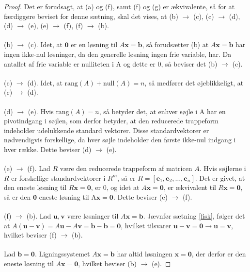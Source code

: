 \begin{proof}
\noindent
Det er forudsagt, at (a) og (f), samt (f) og (g) er ækvivalente, så for at færdiggøre beviset for denne sætning, skal det vises, at (b) $\rightarrow$ (c), (c) $\rightarrow$ (d), (d) $\rightarrow$ (e), (e) $\rightarrow$ (f), (f) $\rightarrow$ (b).
\\\\
%
(b) $\rightarrow$ (c). 
Idet, at $\mathbf{0}$ er en løsning til $A\mathbf{x}=\mathbf{b}$, så forudsætter (b) at $A\mathbf{x}=\mathbf{b}$ har ingen ikke-nul løsninger, da den generelle løsning ingen frie variable, har. 
Da antallet af frie variable er nulliteten i A og dette er 0, så beviser det (b) $\rightarrow$ (c). 
\\\\
%
(c) $\rightarrow$ (d).
Idet, at $\text{rang}(A)+\text{null}(A)=n$, så medfører det øjeblikkeligt, at (c) $\rightarrow$ (d).
\\\\
%
(d) $\rightarrow$ (e).
Hvis $\text{rang}(A)=n$, så betyder det, at enhver søjle i A har en pivotindgang i søjlen, som derfor betyder, at den reducerede trappeform indeholder udelukkende standard vektorer. 
Disse standardvektorer er nødvendigvis forskellige, da hver søjle indeholder den første ikke-nul indgang i hver række. 
Dette beviser (d) $\rightarrow$ (e).
%
\\\\
(e) $\rightarrow$ (f).
Lad $R$ være den reducerede trappeform af matricen $A$. Hvis søjlerne i $R$ er forskellige standardvektorer i $R^m$, så er $R= [ \mathbf{e}_1, \mathbf{e}_2, \ldots, \mathbf{e}_n]$. 
Det er givet, at den eneste løsning til $R\mathbf{x}=\mathbf{0}$, er 0, og idet at $A\mathbf{x}=\mathbf{0}$, er ækvivalent til $R\mathbf{x}=\mathbf{0}$, så er den $\mathbf{0}$ eneste løsning til A$\mathbf{x}=\mathbf{0}$. 
Dette beviser (e) $\rightarrow$ (f).
\\\\
%
(f) $\rightarrow$ (b).
Lad $\mathbf{u}, \mathbf{v}$ være løsninger til $A\mathbf{x}=\mathbf{b}$.
Jævnfør sætning \ref{fisk}, følger det at $A(\mathbf{u}-\mathbf{v})=A\mathbf{u}-A\mathbf{v}=\mathbf{b}-\mathbf{b}=\mathbf{0}$, hvilket tilsvarer $\mathbf{u}-\mathbf{v}=\mathbf{0}
\rightarrow  
\mathbf{u} =\mathbf{v}$, hvilket beviser (f) $\rightarrow$ (b).
\\\\
%
Lad $\mathbf{b}=\mathbf{0}$. 
Ligningssystemet $A\mathbf{x}=\mathbf{b}$ har altid løsningen $\mathbf{x}=\mathbf{0}$, der derfor er den eneste løsning til $A\mathbf{x}=\mathbf{0}$, hvilket beviser (b) $\rightarrow$ (e).
%
\end{proof}
